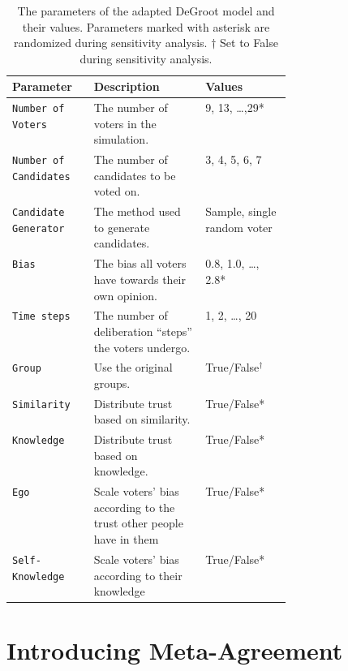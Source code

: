 \renewcommand{\arraystretch}{1.2}
\begin{table}
	\centering
	\begin{tabular}{lp{0.4\linewidth}l}
		\toprule
		Parameter                     & Description                                                         & Values                      \\
		\midrule
		\texttt{Number of Voters}     & The number of voters in the simulation.                             & 9,  13, \dots,29*           \\
		\texttt{Number of Candidates} & The number of candidates to be voted on.                            & 3, 4, 5, 6, 7               \\
		\texttt{Candidate Generator}  & The method used to generate candidates.                             & Sample, single random voter \\
		\texttt{Bias}                 & The bias all voters have towards their own opinion.                 & 0.8, 1.0, \dots, 2.8*       \\
		\texttt{Time steps}           & The number of deliberation ``steps'' the voters undergo.            & 1, 2, \dots, 20             \\
		\texttt{Group}                & Use the original groups.                                            & True/False$^\dagger$        \\
		\texttt{Similarity}           & Distribute trust based on similarity.                               & True/False*                 \\
		\texttt{Knowledge}            & Distribute trust based on knowledge.                                & True/False*                 \\
		\texttt{Ego}                  & Scale voters' bias according to the trust other people have in them & True/False*                 \\
		\texttt{Self-Knowledge}       & Scale voters' bias according to their knowledge                     & True/False*                 \\
		\bottomrule
	\end{tabular}
	\label{tab:independent_variables}
	\caption{The parameters of the adapted DeGroot model and their values. Parameters marked with asterisk are randomized during sensitivity analysis. $\dagger$ Set to False during sensitivity analysis.}
\end{table}


\section{Introducing Meta-Agreement}

